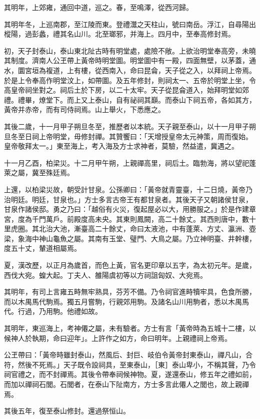 \begin{pinyinscope}
其明年，上郊雍，通回中道，巡之。春，至鳴澤，從西河歸。

其明年冬，上巡南郡，至江陵而東。登禮灊之天柱山，號曰南岳。浮江，自尋陽出樅陽，過彭蠡，禮其名山川。北至瑯邪，并海上。四月中，至奉高修封焉。

初，天子封泰山，泰山東北阯古時有明堂處，處險不敞。上欲治明堂奉高旁，未曉其制度。濟南人公玊帶上黃帝時明堂圖。明堂圖中有一殿，四面無壁，以茅蓋，通水，圜宮垣為複道，上有樓，從西南入，命曰昆侖，天子從之入，以拜祠上帝焉。於是上令奉高作明堂汶上，如帶圖。及五年修封，則祠太一、五帝於明堂上坐，令高皇帝祠坐對之。祠后土於下房，以二十太牢。天子從昆侖道入，始拜明堂如郊禮。禮畢，燎堂下。而上又上泰山，自有祕祠其巔。而泰山下祠五帝，各如其方，黃帝并赤帝，而有司侍祠焉。山上舉火，下悉應之。

其後二歲，十一月甲子朔旦冬至，推歷者以本統。天子親至泰山，以十一月甲子朔旦冬至日祠上帝明堂，毋修封禪。其贊饗曰：「天增授皇帝太元神策，周而復始。皇帝敬拜太一。」東至海上，考入海及方士求神者，莫驗，然益遣，冀遇之。

十一月乙酉，柏梁災。十二月甲午朔，上親禪高里，祠后土。臨勃海，將以望祀蓬萊之屬，冀至殊廷焉。

上還，以柏梁災故，朝受計甘泉。公孫卿曰：「黃帝就青靈臺，十二日燒，黃帝乃治明廷。明廷，甘泉也。」方士多言古帝王有都甘泉者。其後天子又朝諸侯甘泉，甘泉作諸侯邸。勇之乃曰：「越俗有火災，復起屋必以大，用勝服之。」於是作建章宮，度為千門萬戶。前殿度高未央。其東則鳳闕，高二十餘丈。其西則唐中，數十里虎圈。其北治大池，漸臺高二十餘丈，命曰太液池，中有蓬萊、方丈、瀛洲、壺梁，象海中神山龜魚之屬。其南有玉堂、璧門、大鳥之屬。乃立神明臺、井幹樓，度五十丈，輦道相屬焉。

夏，漢改歷，以正月為歲首，而色上黃，官名更印章以五字，為太初元年。是歲，西伐大宛。蝗大起。丁夫人、雒陽虞初等以方祠詛匈奴、大宛焉。

其明年，有司上言雍五畤無牢熟具，芬芳不備。乃令祠官進畤犢牢具，色食所勝，而以木禺馬代駒焉。獨五月嘗駒，行親郊用駒。及諸名山川用駒者，悉以木禺馬代。行過，乃用駒。他禮如故。

其明年，東巡海上，考神僊之屬，未有驗者。方士有言「黃帝時為五城十二樓，以候神人於執期，命曰迎年」。上許作之如方，命曰明年。上親禮祠上帝焉。

公玊帶曰：「黃帝時雖封泰山，然風后、封巨、岐伯令黃帝封東泰山，禪凡山，合符，然後不死焉。」天子既令設祠具，至東泰山，［東］泰山卑小，不稱其聲，乃令祠官禮之，而不封禪焉。其後令帶奉祠候神物。夏，遂還泰山，修五年之禮如前，而加以禪祠石閭。石閭者，在泰山下阯南方，方士多言此僊人之閭也，故上親禪焉。

其後五年，復至泰山修封。還過祭恒山。


\end{pinyinscope}
